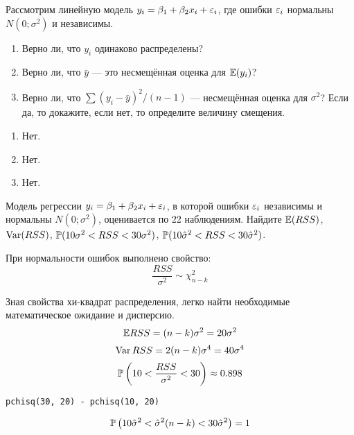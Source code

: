 \begin{problem}
Рассмотрим линейную модель $y_i=\beta_1+\beta_2 x_i +\e_i$, где ошибки $\e_i$ нормальны $N(0;\sigma^2)$ и независимы.
\begin{enumerate}
\item Верно ли, что $y_i$ одинаково распределены?
\item Верно ли, что $\bar{y}$ — это несмещённая оценка для $\E(y_i)$?
\item Верно ли, что $\sum (y_i-\bar{y})^2/(n-1)$ — несмещённая оценка для $\sigma^2$? Если да, то докажите, если нет, то определите величину смещения.
\end{enumerate}


\begin{sol}
\begin{enumerate}
\item Нет.
\item Нет.
\item Нет.
\end{enumerate}
\end{sol}
\end{problem}




\begin{problem}
Модель регрессии $y_i = \beta_1 + \beta_2 x_i + \e_i$, в которой ошибки
$\e_i$ независимы и нормальны $N(0;\sigma^2)$, оценивается по 22 наблюдениям. Найдите $\E(RSS)$, $\Var(RSS)$, $\P(10\sigma^2<RSS<30\sigma^2)$, $\P(10\hs^2<RSS<30\hs^2)$.


\begin{sol}
При нормальности ошибок выполнено свойство:
\[ \frac{RSS}{\sigma^2} \sim \chi^2_{n-k}      \]

Зная свойства хи-квадрат распределения, легко найти необходимые математическое ожидание и дисперсию.
\[ \E RSS = (n - k) \sigma^2 = 20 \sigma^2\]
\[ \Var RSS = 2(n - k)\sigma^4 = 40 \sigma^4\]
\[  \P \left(10 < \frac{RSS}{\sigma^2} < 30\right) \approx 0.898\]

\begin{verbatim}
pchisq(30, 20) - pchisq(10, 20)
\end{verbatim}

\[
\P \left(10 \hat{\sigma}^2 < \hat{\sigma}^2 (n - k)  < 30\hat{\sigma}^2\right) = 1
\]

\end{sol}
\end{problem}




